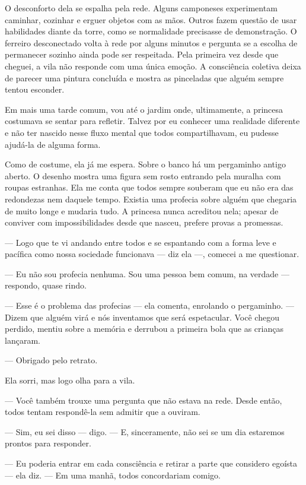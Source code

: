 O desconforto dela se espalha pela rede. Alguns camponeses experimentam caminhar, cozinhar e erguer objetos com as mãos. Outros fazem questão de usar habilidades diante da torre, como se normalidade precisasse de demonstração. O ferreiro desconectado volta à rede por alguns minutos e pergunta se a escolha de permanecer sozinho ainda pode ser respeitada. Pela primeira vez desde que cheguei, a vila não responde com uma única emoção. A consciência coletiva deixa de parecer uma pintura concluída e mostra as pinceladas que alguém sempre tentou esconder.

\bigskip

Em mais uma tarde comum, vou até o jardim onde, ultimamente, a princesa costumava se sentar para refletir. Talvez por eu conhecer uma realidade diferente e não ter nascido nesse fluxo mental que todos compartilhavam, eu pudesse ajudá-la de alguma forma.

Como de costume, ela já me espera. Sobre o banco há um pergaminho antigo aberto. O desenho mostra uma figura sem rosto entrando pela muralha com roupas estranhas. Ela me conta que todos sempre souberam que eu não era das redondezas nem daquele tempo. Existia uma profecia sobre alguém que chegaria de muito longe e mudaria tudo. A princesa nunca acreditou nela; apesar de conviver com impossibilidades desde que nasceu, prefere provas a promessas.

— Logo que te vi andando entre todos e se espantando com a forma leve e pacífica como nossa sociedade funcionava — diz ela —, comecei a me questionar.

— Eu não sou profecia nenhuma. Sou uma pessoa bem comum, na verdade — respondo, quase rindo.

— Esse é o problema das profecias — ela comenta, enrolando o pergaminho. — Dizem que alguém virá e nós inventamos que será espetacular. Você chegou perdido, mentiu sobre a memória e derrubou a primeira bola que as crianças lançaram.

— Obrigado pelo retrato.

Ela sorri, mas logo olha para a vila.

— Você também trouxe uma pergunta que não estava na rede. Desde então, todos tentam respondê-la sem admitir que a ouviram.

— Sim, eu sei disso — digo. — E, sinceramente, não sei se um dia estaremos prontos para responder.

— Eu poderia entrar em cada consciência e retirar a parte que considero egoísta — ela diz. — Em uma manhã, todos concordariam comigo.

